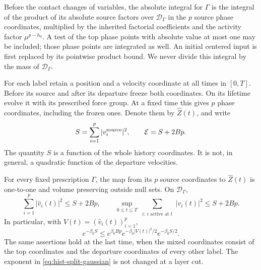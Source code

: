 Before the contact changes of variables, the absolute integral for
$\Gamma$ is the integral of the product of its absolute source factors over
$\mathcal D_\Gamma$ in the $p$ source phase coordinates, multiplied by
the inherited factorial coefficients and the activity factor
$\mu^{p-h_0}$. A test of the top phase points with absolute value at most
one may be included; those phase points are integrated as well.
An initial centered input is first replaced by its pointwise product
bound. We never divide this integral by the mass of $\mathcal D_\Gamma$.

For each label retain a position and a velocity coordinate at all times
in $[0,T]$.  Before its source and after its departure freeze both
coordinates.  On its lifetime evolve it with its prescribed force group.
At a fixed time this gives $p$ phase coordinates, including the frozen
ones.  Denote them by $\widehat Z(t)$, and write
\begin{equation}
 S=\sum_{i=1}^p|v_i^{\rm source}|^2,
 \qquad \mathcal E=S+2Bp.
 \label{eq:hist-source-energy}
\end{equation}
The quantity $S$ is a function of the whole history coordinates.  It is
not, in general, a quadratic function of the departure velocities.

\begin{lemma}
\label{hist:gaussian}
For every fixed prescription $\Gamma$, the map from its $p$ source
coordinates to $\widehat Z(t)$ is one-to-one and volume preserving
outside null sets.  On $\mathcal D_\Gamma$,
\begin{equation}
 \sum_{i=1}^p|\widehat v_i(t)|^2\leq S+2Bp,
 \qquad
 \sup_{0\leq t\leq T}\sum_{\substack{i:\,i\text{ active at }t}}|v_i(t)|^2
       \leq S+2Bp.
 \label{eq:hist-mixed-energy}
\end{equation}
In particular, with $V(t)=(\widehat v_i(t))_{i=1}^p$,
\begin{equation}
 e^{-\beta_0 S}
 \leq e^{\beta_0Bp}
       e^{-\beta_0|V(t)|^2/2}e^{-\beta_0 S/2}.
 \label{eq:hist-split-gaussian}
\end{equation}
The same assertions hold at the last time, when the mixed coordinates
consist of the top coordinates and the departure coordinates of every
other label.  The exponent in \eqref{eq:hist-split-gaussian} is not
changed at a layer cut.
\end{lemma}


